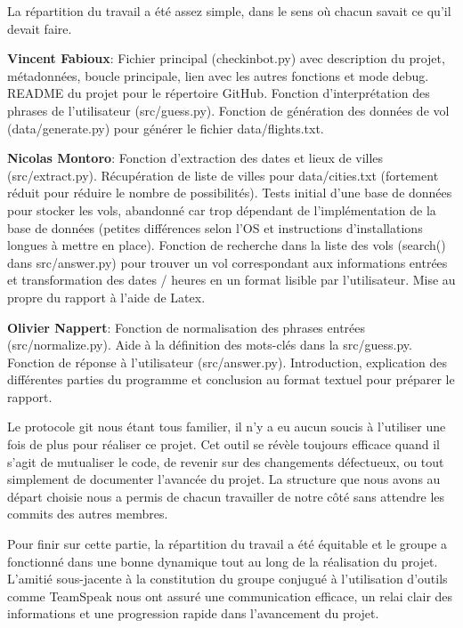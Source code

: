 \documentclass[]{article}
\begin{document}
\bigskip
\newpage
\Huge{\textbf{\color{title}{II) Utilisation de github et répartition du travail}}}
\bigskip
\bigskip
\large{

La répartition du travail a été assez simple, dans le sens où chacun savait ce qu’il devait faire. 

\textbf{Vincent Fabioux}:
Fichier principal (checkinbot.py) avec description du projet, métadonnées, boucle principale, lien avec les autres fonctions et mode debug.
README du projet pour le répertoire GitHub.
Fonction d’interprétation des phrases de l’utilisateur (src/guess.py).
Fonction de génération des données de vol (data/generate.py) pour générer le fichier data/flights.txt.


\textbf{Nicolas Montoro}:
Fonction d’extraction des dates et lieux de villes (src/extract.py).
Récupération de liste de villes pour data/cities.txt (fortement réduit pour réduire le nombre de possibilités).
Tests initial d’une base de données pour stocker les vols, abandonné car trop dépendant de l’implémentation de la base de données (petites différences selon l’OS et instructions d’installations longues à mettre en place).
Fonction de recherche dans la liste des vols (search() dans src/answer.py) pour trouver un vol correspondant aux informations entrées et transformation des dates / heures en un format lisible par l’utilisateur.
Mise au propre du rapport à l’aide de Latex.


\textbf{Olivier Nappert}: 
Fonction de normalisation des phrases entrées (src/normalize.py).
Aide à la définition des mots-clés dans la src/guess.py.
Fonction de réponse à l’utilisateur (src/answer.py).
Introduction, explication des différentes parties du programme et conclusion au format textuel pour préparer le rapport.


Le protocole git nous étant tous familier, il n’y a eu aucun soucis à l’utiliser une fois de plus pour réaliser ce projet. Cet outil se révèle toujours efficace quand il s’agit de mutualiser le code, de revenir sur des changements défectueux, ou tout simplement de documenter l’avancée du projet.
La structure que nous avons au départ choisie nous a permis de chacun travailler de notre côté sans attendre les commits des autres membres.

Pour finir sur cette partie, la répartition du travail a été équitable et le groupe a fonctionné dans une bonne dynamique tout au long de la réalisation du projet. L’amitié sous-jacente à la constitution du groupe conjugué à l’utilisation d’outils comme TeamSpeak nous ont assuré une communication efficace, un relai clair des informations et une progression rapide dans l’avancement du projet.

}
\end{document}
